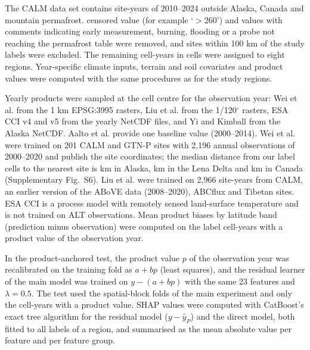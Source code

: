 \documentclass[pdflatex,sn-nature]{sn-jnl}
\begin{document}
The CALM data set\cite{Streletskiy2025} contains \nextRawSy{} site-years of 2010--2024 outside Alaska, Canada and mountain permafrost. \nextCens{} censored value (for example `$>$260') and \nextQcRm{} values with comments indicating early measurement, burning, flooding or a probe not reaching the permafrost table were removed, and sites within 100 km of the study labels were excluded. The remaining \nextcy{} cell-years in \nextcells{} cells were assigned to eight regions. Year-specific climate inputs, terrain and soil covariates and product values were computed with the same procedures as for the study regions.

Yearly products were sampled at the cell centre for the observation year: Wei et al.\cite{Wei2026} from the 1 km EPSG:3995 rasters, Liu et al.\cite{Liu2024} from the 1/120$^\circ$ rasters, ESA CCI v4 and v5\cite{Westermann2024,Westermann2025} from the yearly NetCDF files, and Yi and Kimball\cite{YiKimball2019} from the Alaska NetCDF. Aalto et al.\cite{Aalto2018} provide one baseline value (2000--2014). Wei et al. were trained on 201 CALM and GTN-P sites with 2,196 annual observations of 2000--2020 and publish the site coordinates; the median distance from our label cells to the nearest site is \ndistweiAkmed{} km in Alaska, \ndistweiLemed{} km in the Lena Delta and \ndistweiCamed{} km in Canada (Supplementary Fig.~S6). Liu et al. were trained on 2,966 site-years from CALM, an earlier version of the ABoVE data (2008--2020), ABCflux and Tibetan sites. ESA CCI is a process model with remotely sensed land-surface temperature and is not trained on ALT observations. Mean product biases by latitude band (prediction minus observation) were computed on the label cell-years with a product value of the observation year.

In the product-anchored test, the product value $p$ of the observation year was recalibrated on the training fold as $a+bp$ (least squares), and the residual learner of the main model was trained on $y-(a+bp)$ with the same 23 features and $\lambda=0.5$. The test used the spatial-block folds of the main experiment and only the cell-years with a product value. SHAP values\cite{Lundberg2017} were computed with CatBoost's exact tree algorithm for the residual model ($y-\hat{y}_P$) and the direct model, both fitted to all labels of a region, and summarised as the mean absolute value per feature and per feature group.
\end{document}
